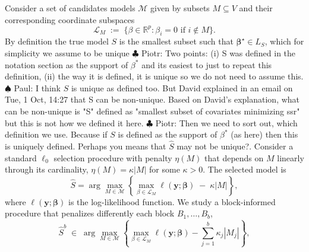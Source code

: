 \documentclass[aos]{imsart}
\theoremstyle{plain}
\newcommand{\piotr}[1]{{\small{\color{red} \sf $\clubsuit$ Piotr: #1}}}
\newcommand{\paul}[1]{{\small{\color{green} \sf $\spadesuit$ Paul: #1}}}
\newcommand{\R}{\mathbb{R}}
\newcommand{\bs}{\boldsymbol}
\begin{document}
Consider a set of candidates models $\mathcal{M}$ given by subsets $M\subseteq V$ and their corresponding coordinate subspaces
$$
\mathcal{L}_M\;:=\;\{\beta\in \R^p: \beta_i=0\mbox{ if }i\notin M\}.
$$
By definition the true model $S$ is the smallest subset such that $\bs\beta^\star\in L_S$, which for simplicity we assume to be unique \piotr{Two points: (i) S was defined in the notation section as the support of $\beta^*$ and its easiest to just to repeat this definition, (ii) the way it is defined, it is unique so we do not need to assume this.} \paul{I think $S$ is unique as defined too. But David explained in an email on Tue, 1 Oct, 14:27 that S can be non-unique. Based on David's explanation, what can be non-unique is "S" defined as "smallest subset of covariates minimizing ssr" but this is not how we defined it here.}\piotr{Then we need to sort out, which definition we use. Because if $S$ is defined as the support of $\beta^*$ (as here) then this is uniquely defined. Perhaps you means that $\widehat S$ may not be unique?}.
Consider a standard $\ell_0$ selection procedure with penalty $\eta(M)$ that depends on $M$ linearly 
through its cardinality, $\eta(M)=\kappa |M|$ for some $\kappa>0$. The selected model is
\begin{equation}\label{eq:stdl0}
\hat{S}= \arg\max_{M\in \mathcal{M}} \left\{\max_{\beta\in \mathcal{L}_M}\ell(\bs y; \bs \beta)\;-\;\kappa |M|\right\},
\end{equation}
where $\ell(\bs y; \bs \beta)$ is the log-likelihood function. 
We study a block-informed procedure that penalizes differently each block $B_1,\ldots,B_b$,
\begin{equation}\label{eq:Mhat}
  \hat S^b\;\in\;\arg\max_{M\in \mathcal{M}} \left\{\max_{\beta\in \mathcal{L}_M}\ell(\bs y; \bs \beta)-\sum_{j=1}^b\kappa_j |M_j| \right\},
\end{equation}
\end{document}
